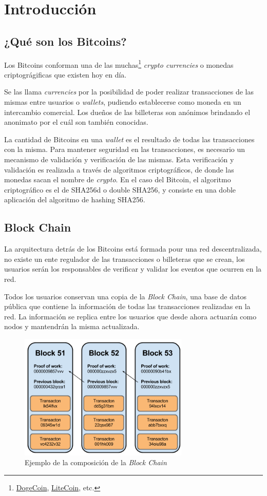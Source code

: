 \documentclass[a4paper, 10pt, twoside]{article}
\begin{document}
\section{Introducción}

\subsection{¿Qué son los Bitcoins?}
Los Bitcoins conforman una de las muchas\footnote{\href{http://dogecoin.com/}{DogeCoin}, \href{https://litecoin.com/}{LiteCoin}, etc.} \textit{crypto currencies} o monedas criptográgificas que existen hoy en día.

Se las llama \textit{currencies} por la posibilidad de poder realizar transacciones de las mismas entre usuarios o \textit{wallets}, pudiendo establecerse como moneda en un intercambio comercial. Los dueños de las billeteras son anónimos brindando el anonimato por el cuál son también conocidas.

La cantidad de Bitcoins en una \textit{wallet} es el resultado de todas las transacciones con la misma. Para mantener seguridad en las transacciones, es necesario un mecanismo de validación y verificación de las mismas. Esta verificación y validación es realizada a través de algoritmos criptográficos, de donde las monedas sacan el nombre de \textit{crypto}. En el caso del Bitcoin, el algoritmo criptográfico es el de SHA256d o double SHA256, y consiste en una doble aplicación del algoritmo de hashing SHA256.

\subsection{Block Chain}
La arquitectura detrás de los Bitcoins está formada pour una red descentralizada, no existe un ente regulador de las transacciones o billeteras que se crean, los usuarios serán los responsables de verificar y validar los eventos que ocurren en la red.

Todos los usuarios conservan una copia de la \textit{Block Chain}, una base de datos pública que contiene la información de todas las transacciones realizadas en la red. La información se replica entre los usuarios que desde ahora actuarán como nodos y mantendrán la misma actualizada.

\begin{figure}[h]
\centering
\includegraphics[height=6cm]{bitcoin-block-chain.png}
\caption{Ejemplo de la composición de la \textit{Block Chain}}
\end{figure}
\end{document}
